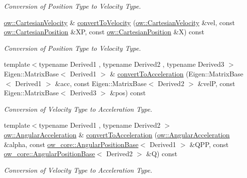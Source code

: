 \begin{DoxyCompactItemize}
\begin{DoxyCompactList}\small\item\em Conversion of Position Type to Velocity Type. \end{DoxyCompactList}\item 
\hyperlink{classow__core_1_1CartesianVelocity}{ow\+::\+Cartesian\+Velocity} \& \hyperlink{classow__core_1_1StateTrajectory_ad0d58ba4322d9c8e98f3510a26688159}{convert\+To\+Velocity} (\hyperlink{classow__core_1_1CartesianVelocity}{ow\+::\+Cartesian\+Velocity} \&vel, const \hyperlink{classow__core_1_1CartesianPosition}{ow\+::\+Cartesian\+Position} \&XP, const \hyperlink{classow__core_1_1CartesianPosition}{ow\+::\+Cartesian\+Position} \&X) const 
\begin{DoxyCompactList}\small\item\em Conversion of Position Type to Velocity Type. \end{DoxyCompactList}\item 
{\footnotesize template$<$typename Derived1 , typename Derived2 , typename Derived3 $>$ }\\Eigen\+::\+Matrix\+Base$<$ Derived1 $>$ \& \hyperlink{classow__core_1_1StateTrajectory_af5af6d6438b437a468eda75346255e91}{convert\+To\+Acceleration} (Eigen\+::\+Matrix\+Base$<$ Derived1 $>$ \&acc, const Eigen\+::\+Matrix\+Base$<$ Derived2 $>$ \&velP, const Eigen\+::\+Matrix\+Base$<$ Derived3 $>$ \&pos) const 
\begin{DoxyCompactList}\small\item\em Conversion of Velocity Type to Acceleration Type. \end{DoxyCompactList}\item 
{\footnotesize template$<$typename Derived1 , typename Derived2 $>$ }\\\hyperlink{classow__core_1_1AngularAcceleration}{ow\+::\+Angular\+Acceleration} \& \hyperlink{classow__core_1_1StateTrajectory_ab13e971d675df50e78ff8996328e50e2}{convert\+To\+Acceleration} (\hyperlink{classow__core_1_1AngularAcceleration}{ow\+::\+Angular\+Acceleration} \&alpha, const \hyperlink{classow__core_1_1AngularPositionBase}{ow\+\_\+core\+::\+Angular\+Position\+Base}$<$ Derived1 $>$ \&Q\+PP, const \hyperlink{classow__core_1_1AngularPositionBase}{ow\+\_\+core\+::\+Angular\+Position\+Base}$<$ Derived2 $>$ \&Q) const 
\begin{DoxyCompactList}\small\item\em Conversion of Velocity Type to Acceleration Type. \end{DoxyCompactList}\item 

\end{DoxyCompactItemize}
